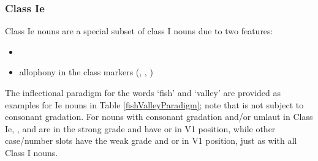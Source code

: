 \subsubsection{Class Ie}\label{NclassIe}
Class Ie nouns are a special subset of class I nouns due to two features:
\begin{itemize}
\item{\jvh}
\item{allophony in the class markers (, , )}
\end{itemize}
The inflectional paradigm for the words  ‘fish’ and  ‘valley’ are provided as examples for Ie nouns in Table \vref{fishValleyParadigm}; note that  is not subject to consonant gradation. 
For nouns with consonant gradation and/or umlaut in Class Ie, ,  and  are in the strong grade and have  or  in V1 position, while other case/number slots have the weak grade and  or  in V1 position, just as with all Class I nouns. 
